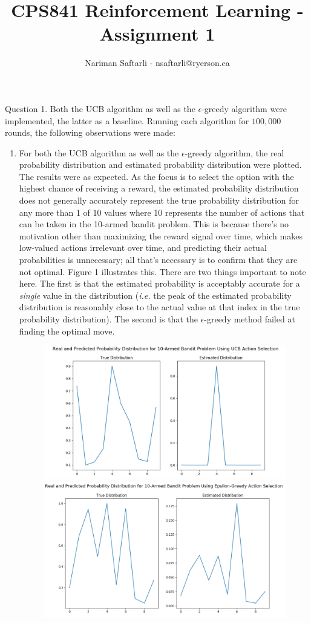 \documentclass{article}
\title{CPS841 Reinforcement Learning - Assignment 1}
\author{Nariman Saftarli - nsaftarli@ryerson.ca}
\begin{document}
\maketitle
\newpage

Question 1.  Both the UCB algorithm as well as the $\epsilon$-greedy algorithm were implemented, the latter as a baseline. Running each algorithm for $100,000$ rounds, the following observations were made:
	\begin{enumerate}
	\item For both the UCB algorithm as well as the $\epsilon$-greedy algorithm, the real probability distribution and estimated probability distribution were plotted. The results were as expected. As the focus is to select the option with the highest chance of receiving a reward, the estimated probability distribution does not generally accurately represent the true probability distribution for any more than 1 of 10 values where 10 represents the number of actions that can be taken in the 10-armed bandit problem. This is because there's no motivation other than maximizing the reward signal over time, which makes low-valued actions irrelevant over time, and predicting their actual probabilities is unnecessary; all that's necessary is to confirm that they are not optimal. Figure 1 illustrates this. There are two things important to note here. The first is that the estimated probability is acceptably accurate for a \textit{single} value in the distribution (\textit{i.e.} the peak of the estimated probability distribution is reasonably close to the actual value at that index in the true probability distribution). The second is that the $\epsilon$-greedy method failed at finding the optimal move.
	\begin{figure}[h]
	\centering
	\includegraphics[scale=0.2]{ucb_pred}
	\includegraphics[scale=0.2]{eps_pred}

\end{figure}
\end{enumerate}
\end{document}
